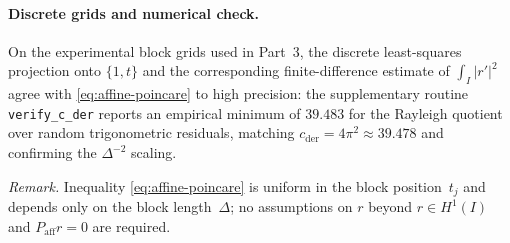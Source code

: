 \paragraph{Discrete grids and numerical check.}
On the experimental block grids used in Part~3, the discrete least-squares projection
onto $\{1,t\}$ and the corresponding finite-difference estimate of $\int_I |r'|^2$
agree with \eqref{eq:affine-poincare} to high precision: the supplementary routine
\texttt{verify\_c\_der} reports an empirical minimum of $39.483$ for the Rayleigh
quotient over random trigonometric residuals, matching $c_{\mathrm{der}}=4\pi^2\approx39.478$
and confirming the $\Delta^{-2}$ scaling.

\medskip
\noindent
\emph{Remark.}
Inequality \eqref{eq:affine-poincare} is uniform in the block position~$t_j$
and depends only on the block length~$\Delta$; no assumptions on $r$ beyond
$r\in H^1(I)$ and $P_{\mathrm{aff}} r=0$ are required.
